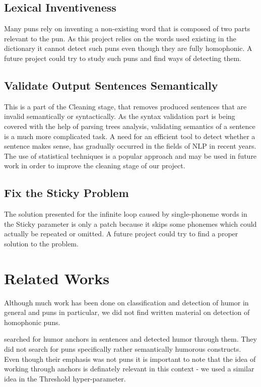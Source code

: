 \documentclass[11pt,a4paper]{article}
\begin{document}
\subsection{Lexical Inventiveness}
Many puns rely on inventing a non-existing word that is composed of two parts relevant to the pun. As this project relies on the words used existing in the dictionary it cannot detect such puns even though they are fully homophonic. A future project could try to study such puns and find ways of detecting them.

\subsection{Validate Output Sentences Semantically}
This is a part of the Cleaning stage, that removes produced sentences that are invalid semantically or syntactically. As the syntax validation part is being covered with the help of parsing trees analysis, validating semantics of a sentence is a much more complicated task. A need for an efficient tool to detect whether a sentence makes sense, has gradually occurred in the fields of NLP in recent years. The use of statistical techniques is a popular approach and may be used in future work in order to improve the cleaning stage of our project.

\subsection{Fix the Sticky Problem}
The solution presented for the infinite loop caused by single-phoneme words in the Sticky parameter is only a patch because it skips some phonemes which could actually be repeated or omitted. A future project could try to find a proper solution to the problem.

\section{Related Works}

Although much work has been done on classification and detection of humor in general and puns in particular, we did not find written material on detection of homophonic puns.

\citet{yang_lavie_dyer_hovy_2015} searched for humor anchors in sentences and detected humor through them. They did not search for puns specifically rather semantically humorous constructs. Even though their emphasis was not puns it is important to note that the idea of working through anchors is definately relevant in this context - we used a similar idea in the Threshold hyper-parameter.
\end{document}
